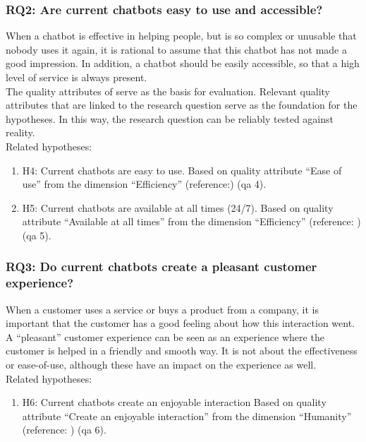 \subsubsection{RQ2: Are current chatbots easy to use and accessible?}
When a chatbot is effective in helping people, but is so complex or unusable that nobody uses it again, it is rational to assume that this chatbot has not made a good impression. In addition, a chatbot should be easily accessible, so that a high level of service is always present.\\
The quality attributes of \citep{Verkeyn2018} serve as the basis for evaluation. Relevant quality attributes that are linked to the research question serve as the foundation for the hypotheses. In this way, the research question can be reliably tested against reality.\\
\break
\break
Related hypotheses:
\begin{enumerate}
	\setlength\itemsep{-0.1em}
	\item H4: Current  chatbots are easy to use. Based on \citep{Verkeyn2018} quality attribute “Ease of use” from the dimension “Efficiency” (reference:\citep*{Candela2018, Duijst2017}) (\acrshort{qa} 4).
	\item H5: Current  chatbots are available at all times (24/7). Based on \citep{Verkeyn2018} quality attribute “Available at all times” from the dimension “Efficiency” (reference: \citep{Wang2019}) (\acrshort{qa} 5).
\end{enumerate}

\subsubsection{RQ3: Do current chatbots create a pleasant customer experience?}
When a customer uses a service or buys a product from a company, it is important that the customer has a good feeling about how this interaction went.\\
\break
A “pleasant” customer experience can be seen as an experience where the customer is helped in a friendly and smooth way. It is not about the effectiveness or ease-of-use, although these have an impact on the experience as well. \\
\break
\break
Related hypotheses:
\begin{enumerate}
	\setlength\itemsep{-0.1em}
	\item H6: Current chatbots create an enjoyable interaction Based on \citep{Verkeyn2018} quality attribute “Create an enjoyable interaction” from the dimension “Humanity” (reference: \citep{Morrissey2013}) (\acrshort{qa} 6).
\end{enumerate}

